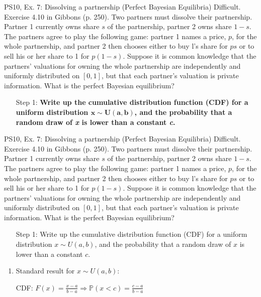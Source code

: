 \begin{frame}{PS10, Ex. 7: Dissolving a partnership (Perfect Bayesian Equilibria)}
    Difficult. Exercise 4.10 in Gibbons (p. 250). Two partners must dissolve their partnership. Partner 1 currently owns share $s$ of the partnership, partner 2 owns share $1-s$. The partners agree to play the following game: partner 1 names a price, $p$, for the whole partnership, and partner 2 then chooses either to buy l's share for $ps$ or to sell his or her share to 1 for $p(1-s)$. Suppose it is common knowledge that the partners' valuations for owning the whole partnership are independently and uniformly distributed on $[0,1]$, but that each partner's valuation is private information. What is the perfect Bayesian equilibrium?\vspace{-8pt}
    \begin{multicols}{2}
      \begin{itemize}
        \item[Step 1:] \textbf{Write up the cumulative distribution function (CDF) for a uniform distribution $\bm{x\sim U(a, b)}$, and the probability that a random draw of \textit{x} is lower than a constant \textit{c}.}
      \end{itemize}
      \vfill\null\columnbreak
      \vfill\null
    \end{multicols}
\end{frame}
\begin{frame}{PS10, Ex. 7: Dissolving a partnership (Perfect Bayesian Equilibria)}
    Difficult. Exercise 4.10 in Gibbons (p. 250). Two partners must dissolve their partnership. Partner 1 currently owns share $s$ of the partnership, partner 2 owns share $1-s$. The partners agree to play the following game: partner 1 names a price, $p$, for the whole partnership, and partner 2 then chooses either to buy l's share for $ps$ or to sell his or her share to 1 for $p(1-s)$. Suppose it is common knowledge that the partners' valuations for owning the whole partnership are independently and uniformly distributed on $[0,1]$, but that each partner's valuation is private information. What is the perfect Bayesian equilibrium?\vspace{-8pt}
    \begin{multicols}{2}
      \begin{itemize}
        \item[Step 1:] Write up the cumulative distribution function (CDF) for a uniform distribution $x\sim U(a, b)$, and the probability that a random draw of $x$ is lower than a constant $c$.
      \end{itemize}
      \vfill\null\columnbreak
      \begin{enumerate}
        \item Standard result for $x\sim U(a, b):$
        \item[CDF:] $F(x)=\frac{x-a}{b-a}\Rightarrow\mathbb{P}(x<c)=\frac{c-a}{b-a}$
      \end{enumerate}
      \vfill\null
    \end{multicols}
\end{frame}
